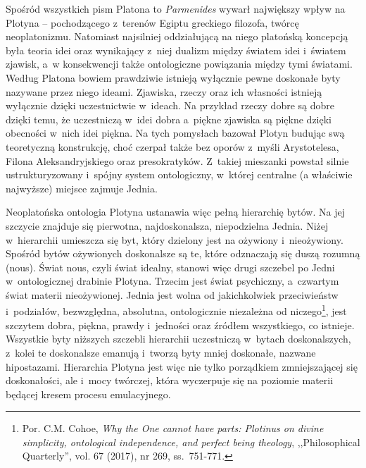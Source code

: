 Spośród wszystkich pism Platona to \textit{Parmenides} wywarł największy wpływ na Plotyna -- pochodzącego z~terenów Egiptu greckiego filozofa, twórcę neoplatonizmu. Natomiast najsilniej oddziałującą na niego platońską koncepcją była teoria idei oraz wynikający z~niej dualizm między światem idei i~światem zjawisk, a~w konsekwencji także ontologiczne powiązania między tymi światami. Według Platona bowiem prawdziwie istnieją wyłącznie pewne doskonałe byty nazywane przez niego ideami. Zjawiska, rzeczy oraz ich własności istnieją wyłącznie dzięki uczestnictwie w~ideach. Na przykład rzeczy dobre są dobre dzięki temu, że uczestniczą w~idei dobra a~piękne zjawiska są piękne dzięki obecności w~nich idei piękna. Na tych pomysłach bazował Plotyn budując swą teoretyczną konstrukcję, choć czerpał także bez oporów z~myśli Arystotelesa, Filona Aleksandryjskiego oraz presokratyków. Z~takiej mieszanki powstał silnie ustrukturyzowany i~spójny system ontologiczny, w~której centralne (a właściwie najwyższe) miejsce zajmuje Jednia.

Neoplatońska ontologia Plotyna ustanawia więc pełną hierarchię bytów. Na jej szczycie znajduje się pierwotna, najdoskonalsza, niepodzielna Jednia. Niżej w~hierarchii umieszcza się byt, który dzielony jest na ożywiony i~nieożywiony. Spośród bytów ożywionych doskonalsze są te, które odznaczają się duszą rozumną (nous). Świat nous, czyli świat idealny, stanowi więc drugi szczebel po Jedni w~ontologicznej drabinie Plotyna. Trzecim jest świat psychiczny, a~czwartym świat materii nieożywionej. Jednia jest wolna od jakichkolwiek przeciwieństw i~podziałów, bezwzględna, absolutna, ontologicznie niezależna od niczego\footnote{Por. C.M. Cohoe, \textit{Why the One cannot have parts: Plotinus on divine simplicity, ontological independence, and perfect being theology}, ,,Philosophical Quarterly'', vol. 67 (2017), nr 269, ss.~751-771.}, jest szczytem dobra, piękna, prawdy i~jedności oraz źródłem wszystkiego, co istnieje. Wszystkie byty niższych szczebli hierarchii uczestniczą w~bytach doskonalszych, z~kolei te doskonalsze emanują i~tworzą byty mniej doskonałe, nazwane hipostazami. Hierarchia Plotyna jest więc nie tylko porządkiem zmniejszającej się doskonałości, ale i~mocy twórczej, która wyczerpuje się na poziomie materii będącej kresem procesu emulacyjnego.

